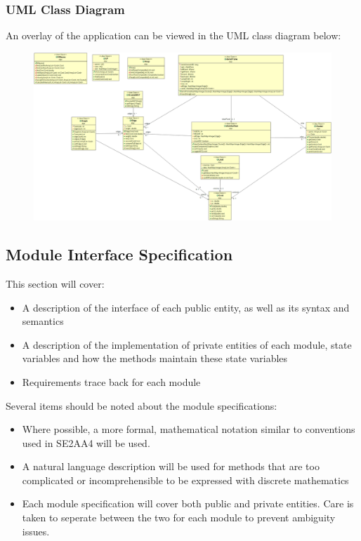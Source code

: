 \documentclass[12pt]{article}
\begin{document}
\subsubsection{UML Class Diagram}
An overlay of the application can be viewed in the UML class diagram below:
\begin{figure}[h]
\centering
\includegraphics[width=1.0\textwidth]{UML.png}
\end{figure}

\newpage
\subsection{Module Interface Specification}
This section will cover:
\begin{itemize}
\item A description of the interface of each public entity, as well as its syntax
and semantics
\item A description of the implementation of private entities of each module,
state variables and how the methods maintain these state variables
\item Requirements trace back for each module
\end{itemize}

\noindent
Several items should be noted about the module specifications:
\begin{itemize}
\item Where possible, a more formal, mathematical notation similar to conventions 
used in SE2AA4 will be used.
\item A natural language description will be used for methods that are too
complicated or incomprehensible to be expressed with discrete mathematics
\item Each module specification will cover both public and private entities. Care
is taken to seperate between the two for each module to prevent ambiguity issues.
\end{itemize}
\end{document}
